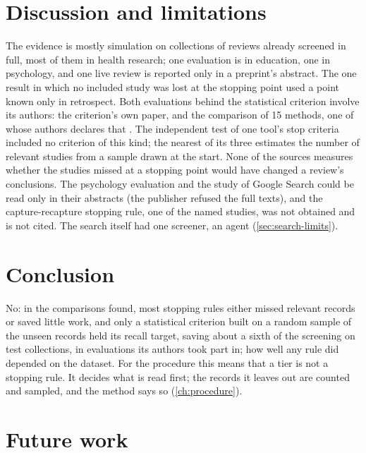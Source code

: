 \section{Discussion and limitations}
\label{sec:stopping-discussion}

The evidence is mostly simulation on collections of reviews already
screened in full, most of them in health research; one evaluation is in
education, one in psychology, and one live review is reported only in a
preprint's abstract.
The one result in which no included study was lost at the stopping point
used a point known only in retrospect.
Both evaluations behind the statistical criterion involve its authors:
the criterion's own paper, and the comparison of 15 methods, one of whose
authors declares that .
The independent test of one tool's stop criteria included no criterion of
this kind; the nearest of its three estimates the number of relevant
studies from a sample drawn at the start.
None of the sources measures whether the studies missed at a stopping
point would have changed a review's conclusions.
The psychology evaluation and the study of Google Search could be read
only in their abstracts (the publisher refused the full texts), and the
capture-recapture stopping rule, one of the named studies, was not
obtained and is not cited.
The search itself had one screener, an agent (\cref{sec:search-limits}).

\section{Conclusion}
\label{sec:stopping-conclusion}

No: in the comparisons found, most stopping rules either missed relevant
records or saved little work, and only a statistical criterion built on
a random sample of the unseen records held its recall target, saving
about a sixth of the screening on test collections, in evaluations its
authors took part in; how well any rule did depended on the dataset.
For the procedure this means that a tier is not a stopping rule.
It decides what is read first; the records it leaves out are counted and
sampled, and the method says so (\cref{ch:procedure}).

\section{Future work}
\label{sec:stopping-future}

